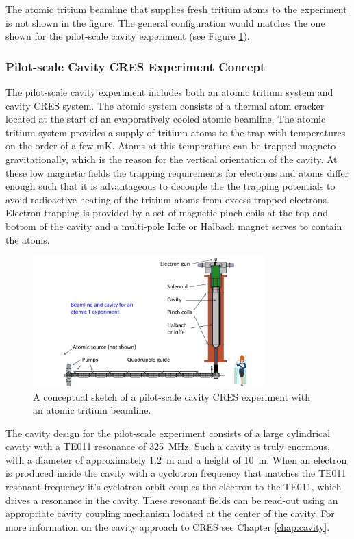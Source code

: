 The atomic tritium beamline that supplies fresh tritium atoms to the experiment is not shown in the figure. The general configuration would matches the one shown for the pilot-scale cavity experiment (see Figure \ref{fig:chap3-cavity-pilot-scale}).

\subsubsection*{Pilot-scale Cavity CRES Experiment Concept}

The pilot-scale cavity experiment includes both an atomic tritium system and cavity CRES system. The atomic system consists of a thermal atom cracker located at the start of an evaporatively cooled atomic beamline. The atomic tritium system provides a supply of tritium atoms to the trap with temperatures on the order of a few mK. Atoms at this temperature can be trapped magneto-gravitationally, which is the reason for the vertical orientation of the cavity. At these low magnetic fields the trapping requirements for electrons and atoms differ enough such that it is advantageous to decouple the the trapping potentials to avoid radioactive heating of the tritium atoms from excess trapped electrons. Electron trapping is provided by a set of magnetic pinch coils at the top and bottom of the cavity and a multi-pole Ioffe or Halbach magnet serves to contain the atoms.

\begin{figure}[htbp]
    \centering
    \includegraphics*[width=0.8\textwidth]{figs/Chapter-3/CavityAndBeamAndPerson2.pdf}
    \caption{\label{fig:chap3-cavity-pilot-scale} A conceptual sketch of a pilot-scale cavity CRES experiment with an atomic tritium beamline.}
\end{figure}

The cavity design for the pilot-scale experiment consists of a large cylindrical cavity with a TE011 resonance of 325~MHz. Such a cavity is truly enormous, with a diameter of approximately 1.2~m and a height of 10~m. When an electron is produced inside the cavity with a cyclotron frequency that matches the TE011 resonant frequency it's cyclotron orbit couples the electron to the TE011, which drives a resonance in the cavity. These resonant fields can be read-out using an appropriate cavity coupling mechanism located at the center of the cavity. For more information on the cavity approach to CRES see Chapter \ref{chap:cavity}.



